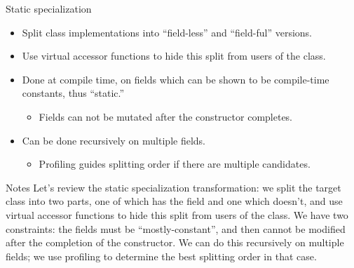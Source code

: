 \documentclass[%
pdf,
colorBG,
slideColor,
nototal,
oqe
]{prosper}
\newenvironment{talknotes}{\begin{slide}{Notes}\tiny}{\end{slide}}
\begin{document}
\begin{slide}{Static specialization}
\begin{itemize}
\item Split class implementations into ``field-less'' and
  ``field-ful'' versions.
\item Use virtual accessor functions to hide this split from users of
  the class.
\item Done at compile time, on fields which can be shown to be
  compile-time constants, thus ``static.''
\begin{itemize}
\item Fields can not be mutated after the constructor completes.
\end{itemize}
\item Can be done recursively on multiple fields.
\begin{itemize}
\item Profiling guides splitting order if there are multiple candidates.
\end{itemize}
\end{itemize}
\end{slide}

\begin{talknotes}
Let's review the static specialization transformation:  we split the
target class into two parts, one of which has the field and one which
doesn't, and use virtual accessor functions to hide this split from
users of the class.  We have two constraints: the fields must be
``mostly-constant'', and then cannot be modified after the completion
of the constructor.
We can do this recursively on multiple fields; we use profiling to
determine the best splitting order in that case.
\end{talknotes}

\end{document}
